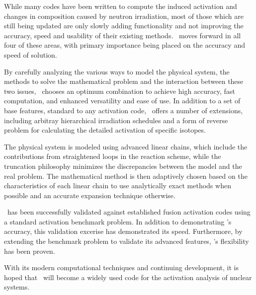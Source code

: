 
\maketitle

\begin{myabstract}
  
  While many codes have been written to compute the induced activation
  and changes in composition caused by neutron irradiation, most of
  those which are still being updated are only slowly adding
  functionality and not improving the accuracy, speed and usability of
  their existing methods.  \ALARA\ moves forward in all four of these
  areas, with primary importance being placed on the accuracy and
  speed of solution.
  
  By carefully analyzing the various ways to model the physical
  system, the methods to solve the mathematical problem and the
  interaction between these two issues, \ALARA\ chooses an optimum
  combination to achieve high accuracy, fast computation, and enhanced
  versatility and ease of use.  In addition to a set of base features,
  standard to any activation code, \ALARA\ offers a number of
  extensions, including arbitray hierarchical irradiation schedules
  and a form of reverse problem for calculating the detailed
  activation of specific isotopes.
  
  The physical system is modeled using advanced linear chains, which
  include the contributions from straightened loops in the reaction
  scheme, while the truncation philosophy minimizes the discrepancies
  between the model and the real problem.  The mathematical method is
  then adaptively chosen based on the characteristics of each linear
  chain to use analytically exact methods when possible and an
  accurate expansion technique otherwise.
  
  \ALARA\ has been successfully validated against established fusion
  activation codes using a standard activation benchmark problem.  In
  addition to demonstrating \ALARA's accuracy, this validation
  excerise has demonstrated its speed.  Furthermore, by extending the
  benchmark problem to validate its advanced features, \ALARA's
  flexibility has been proven.
  
  With its modern computational techniques and continuing development,
  it is hoped that \ALARA\ will become a widely used code for the
  activation analysis of nuclear systems.

\end{myabstract}

\tableofcontents

\listoffigures

\listoftables









